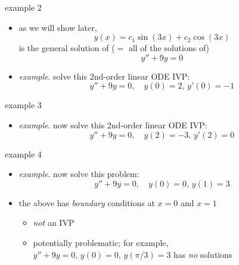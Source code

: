 \documentclass{beamer}
\begin{document}
\begin{frame}{example 2}

\begin{itemize}
\item as we will show later,
    $$y(x) = c_1 \sin(3x) + c_2 \cos(3x)$$
is the general solution of ($=$ all of the solutions of)
    $$y'' + 9 y = 0$$
\item \emph{example}.  solve this 2nd-order linear ODE IVP:
    $$y'' + 9y = 0, \quad y(0)=2, \, y'(0)=-1$$
\end{itemize}

\vspace{25mm}
\end{frame}


\begin{frame}{example 3}

\begin{itemize}
\item \emph{example}.  now solve this 2nd-order linear ODE IVP:
    $$y'' + 9y = 0, \quad y(2)=-3, \, y'(2)=0$$
\end{itemize}

\vspace{40mm}
\end{frame}


\begin{frame}{example 4}

\begin{itemize}
\item \emph{example}.  now solve this problem:
    $$y'' + 9y = 0, \quad y(0)=0, \, y(1)=3$$

\vspace{40mm}
\item the above has \emph{boundary} conditions at $x=0$ and $x=1$
    \begin{itemize}
    \item \emph{not} an IVP
    \item potentially problematic; for example, $y'' + 9y = 0, \, y(0)=0, \, y(\pi/3)=3$ has \emph{no} solutions
    \end{itemize}
\end{itemize}
\end{frame}
\end{document}
